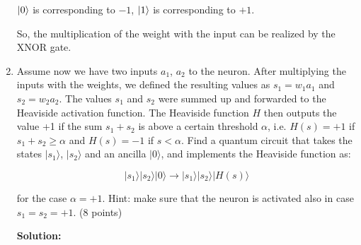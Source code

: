 \documentclass[12pt]{article}
\begin{document}
\begin{enumerate}
          $\ket{0}$ is corresponding to $-1$, $\ket{1}$ is corresponding to $+1$.

          So, the multiplication of the weight with the input can be realized by the XNOR gate.



    \item Assume now we have two inputs $a_1$, $a_2$ to the neuron. After multiplying the inputs with the weights, we defined the resulting values as $s_1 = w_1a_1$ and $s_2 = w_2a_2$. The values $s_1$ and $s_2$ were summed up and forwarded to the Heaviside activation function. The Heaviside function $H$ then outputs the value +1 if the sum $s_1 + s_2$ is above a certain threshold $\alpha$, i.e. $H(s) = +1$ if $s_1 + s_2 \geq \alpha$ and $H(s) = -1$ if $s < \alpha$. Find a quantum circuit that takes the states $|s_1\rangle$, $|s_2\rangle$ and an ancilla $|0\rangle$, and implements the Heaviside function as:

          \begin{equation}
              |s_1\rangle|s_2\rangle|0\rangle \rightarrow |s_1\rangle|s_2\rangle|H(s)\rangle
          \end{equation}

          for the case $\alpha = +1$. Hint: make sure that the neuron is activated also in case $s_1 = s_2 = +1$. (8 points)

          \textbf{Solution:}

          

\end{enumerate}
\end{document}
